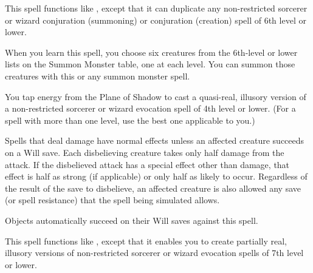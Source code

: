 \begin{spelleffect}
  This spell functions like , except that it can duplicate any non-restricted sorcerer or wizard conjuration (summoning) or conjuration (creation) spell of 6th level or lower.
\end{spelleffect}
\begin{spellnotes}
  When you learn this spell, you choose six creatures from the 6th-level or lower lists on the Summon Monster table, one at each level. You can summon those creatures with this or any summon monster spell.
\end{spellnotes}

\begin{spelleffect}
  You tap energy from the Plane of Shadow to cast a quasi-real, illusory version of a non-restricted sorcerer or wizard evocation spell of 4th level or lower. (For a spell with more than one level, use the best one applicable to you.)
  \par Spells that deal damage have normal effects unless an affected creature succeeds on a Will save. Each disbelieving creature takes only half damage from the attack. If the disbelieved attack has a special effect other than damage, that effect is half as strong (if applicable) or only half as likely to occur. Regardless of the result of the save to disbelieve, an affected creature is also allowed any save (or spell resistance) that the spell being simulated allows.
\end{spelleffect}
\begin{spellnotes}
  Objects automatically succeed on their Will saves against this spell.
\end{spellnotes}

\begin{spelleffect}
  This spell functions like , except that it enables you to create partially real, illusory versions of non-restricted sorcerer or wizard evocation spells of 7th level or lower.
\end{spelleffect}


